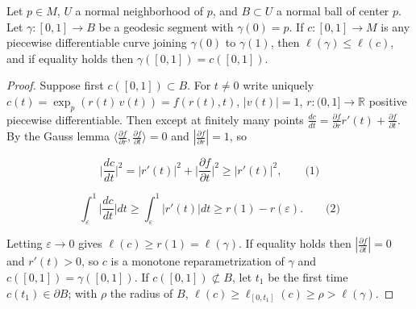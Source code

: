 \begin{proposition}
  \label{prop:dc-ch3-3-6}


  Let $p\in M$, $U$ a normal neighborhood of $p$, and $B\subset U$ a normal ball of
  center $p$. Let $\gamma:[0,1]\to B$ be a geodesic segment with $\gamma(0)=p$. If
  $c:[0,1]\to M$ is any piecewise differentiable curve joining $\gamma(0)$ to
  $\gamma(1)$, then $\ell(\gamma)\le\ell(c)$, and if equality holds then
  $\gamma([0,1])=c([0,1])$.
\end{proposition}
\begin{proof}
  \sketch

  Suppose first $c([0,1])\subset B$. For $t\ne 0$ write uniquely
  $c(t)=\exp_p(r(t)\,v(t))=f(r(t),t)$, $|v(t)|=1$, $r:(0,1]\to\mathbb{R}$ positive
  piecewise differentiable. Then except at finitely many points
  $\frac{dc}{dt}=\frac{\partial f}{\partial r}r'(t)+\frac{\partial f}{\partial t}$.
  By the Gauss lemma $\langle\frac{\partial f}{\partial r},\frac{\partial f}{\partial t}\rangle=0$
  and $|\frac{\partial f}{\partial r}|=1$, so

  $$
  \Big|\frac{dc}{dt}\Big|^2=|r'(t)|^2+\Big|\frac{\partial f}{\partial t}\Big|^2\ge|r'(t)|^2,\qquad\text{(1)}
  $$

  $$
  \int_\varepsilon^1\Big|\frac{dc}{dt}\Big|dt\ge\int_\varepsilon^1|r'(t)|dt\ge r(1)-r(\varepsilon).\qquad\text{(2)}
  $$

  Letting $\varepsilon\to0$ gives $\ell(c)\ge r(1)=\ell(\gamma)$. If equality holds
  then $|\frac{\partial f}{\partial t}|=0$ and $r'(t)>0$, so $c$ is a monotone
  reparametrization of $\gamma$ and $c([0,1])=\gamma([0,1])$. If $c([0,1])\not\subset B$,
  let $t_1$ be the first time $c(t_1)\in\partial B$; with $\rho$ the radius of $B$,
  $\ell(c)\ge\ell_{[0,t_1]}(c)\ge\rho>\ell(\gamma)$.
\end{proof}


